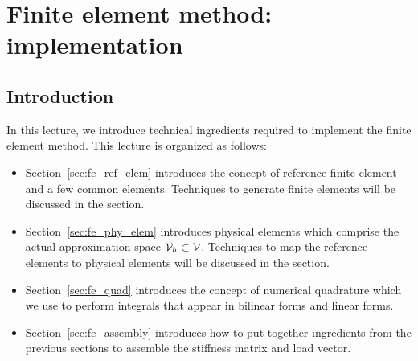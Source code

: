 \chapter{Finite element method: implementation}

\section{Introduction}
In this lecture, we introduce technical ingredients required to implement the finite element method. This lecture is organized as follows:
\begin{itemize}
\item Section~\ref{sec:fe_ref_elem} introduces the concept of reference finite element and a few common elements.  Techniques to generate finite elements will be discussed in the section.
\item Section~\ref{sec:fe_phy_elem} introduces physical elements which comprise the actual approximation space $\mathcal{V}_h \subset \mathcal{V}$.  Techniques to map the reference elements to physical elements will be discussed in the section.
\item Section~\ref{sec:fe_quad} introduces the concept of numerical quadrature which we use to perform integrals that appear in bilinear forms and linear forms.
\item Section~\ref{sec:fe_assembly} introduces how to put together ingredients from the previous sections to assemble the stiffness matrix and load vector.
\end{itemize}







